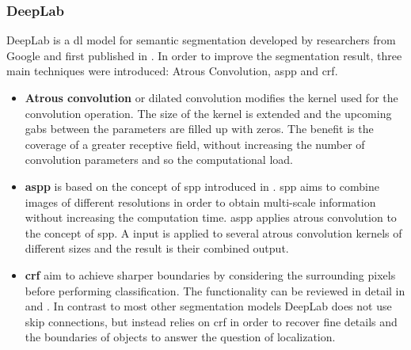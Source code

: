 \subsubsection{DeepLab}
DeepLab is a \gls{dl} model for semantic segmentation developed by researchers from Google and first published in \cite{Chen16-DeepLab}.
In order to improve the segmentation result, three main techniques were introduced: Atrous Convolution, \gls{aspp} and \gls{crf}.
\begin{itemize}
	\item \textbf{Atrous convolution} or dilated convolution modifies the kernel used for the convolution operation. 
	The size of the kernel is extended and the upcoming gabs between the parameters are filled up with zeros.
	The benefit is the coverage of a greater receptive field, without increasing the number of convolution parameters and so the computational load.
	\item \textbf{\gls{aspp}} is based on the concept of \gls{spp} introduced in \cite{He15-SPP}.
	\gls{spp} aims to combine images of different resolutions in order to obtain multi-scale information without increasing the computation time.
	\gls{aspp} applies atrous convolution to the concept of \gls{spp}.
	A input is applied to several atrous convolution kernels of different sizes and the result is their combined output. 	
	\item \textbf{\gls{crf}} aim to achieve sharper boundaries by considering the surrounding pixels before performing classification.
	The functionality can be reviewed in detail in \cite{Chen16-DeepLab} and \cite{KK12-CRF}.
	In contrast to most other segmentation models DeepLab does not use skip connections, but instead relies on \gls{crf} in order to recover fine details and the boundaries of objects to answer the question of localization.
\end{itemize}

